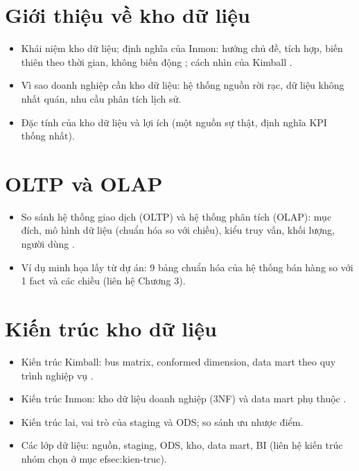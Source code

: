 
\section{Giới thiệu về kho dữ liệu}
\begin{itemize}
  \item Khái niệm kho dữ liệu; định nghĩa của Inmon: hướng chủ đề, tích hợp, biến thiên theo thời gian, không biến động \cite{inmon2005}; cách nhìn của Kimball \cite{kimball2013}.
  \item Vì sao doanh nghiệp cần kho dữ liệu: hệ thống nguồn rời rạc, dữ liệu không nhất quán, nhu cầu phân tích lịch sử.
  \item Đặc tính của kho dữ liệu và lợi ích (một nguồn sự thật, định nghĩa KPI thống nhất).
\end{itemize}

\section{OLTP và OLAP}
\begin{itemize}
  \item So sánh hệ thống giao dịch (OLTP) và hệ thống phân tích (OLAP): mục đích, mô hình dữ liệu (chuẩn hóa so với chiều), kiểu truy vấn, khối lượng, người dùng \cite{chaudhuri1997}.
  \item Ví dụ minh họa lấy từ dự án: 9 bảng chuẩn hóa của hệ thống bán hàng so với 1 fact và các chiều (liên hệ Chương 3).
\end{itemize}

\section{Kiến trúc kho dữ liệu}
\begin{itemize}
  \item Kiến trúc Kimball: bus matrix, conformed dimension, data mart theo quy trình nghiệp vụ \cite{kimball2013}.
  \item Kiến trúc Inmon: kho dữ liệu doanh nghiệp (3NF) và data mart phụ thuộc \cite{inmon2005}.
  \item Kiến trúc lai, vai trò của staging và ODS; so sánh ưu nhược điểm.
  \item Các lớp dữ liệu: nguồn, staging, ODS, kho, data mart, BI (liên hệ kiến trúc nhóm chọn ở mục 
ef{sec:kien-truc}).
\end{itemize}

